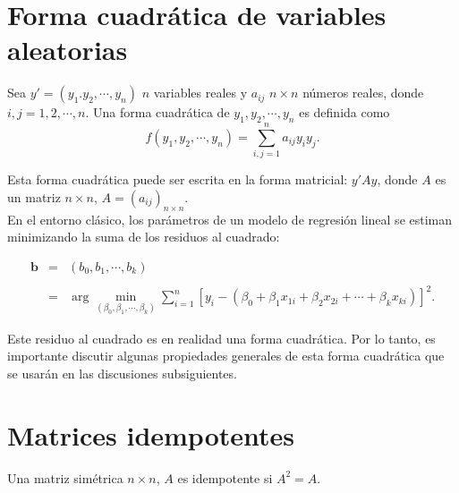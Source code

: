 \section{Forma cuadrática de variables aleatorias}

\begin{def.}
    Sea $y'=(y_1.y_2,\cdots,y_n)$ $n$ variables reales y $a_{ij}$ $n\times n$ números reales, donde $i,j=1,2,\cdots,n.$ Una forma cuadrática de $y_1,y_2,\cdots,y_n$ es definida como
    $$f(y_1,y_2,\cdots,y_n)=\sum_{i,j=1}^n a_{ij}y_iy_j.$$
\end{def.}

Esta forma cuadrática puede ser escrita en la forma matricial: $y'Ay$, donde $A$ es un matriz $n\times n$, $A=(a_{ij})_{n\times n}$.\\

En el entorno clásico, los parámetros de un modelo de regresión lineal se estiman minimizando la suma de los residuos al cuadrado:

$$
\begin{array}{rcl}
    \textbf{b} &=& (b_0,b_1,\cdots, b_k)\\\\
	       &=& \arg\min_{(\beta_0,\beta_1,\cdots,\beta_k)}\displaystyle\sum_{i=1}^n \left[y_i-\left(\beta_0+\beta_1x_{1i}+\beta_2x_{2i}+\cdots+\beta_{k}x_{ki}\right)\right]^2.
\end{array}
$$

Este residuo al cuadrado es en realidad una forma cuadrática. Por lo tanto, es importante discutir algunas propiedades generales de esta forma cuadrática que se usarán en las discusiones subsiguientes.


\section{Matrices idempotentes}

\begin{def.}
    Una matriz simétrica $n\times n$, $A$ es idempotente si $A^2=A.$
\end{def.}




